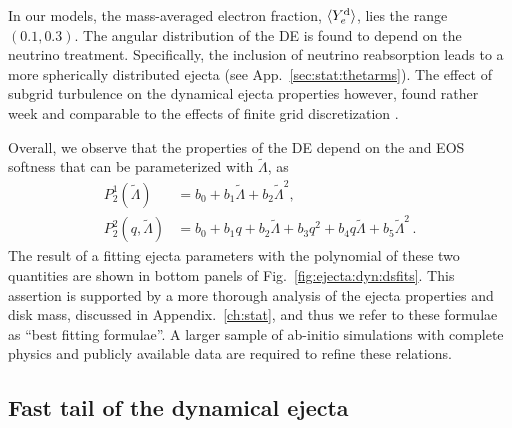 In our models, the mass-averaged electron fraction, $\langle Y^{\text{d}}_{e}\rangle$, 
lies the range $(0.1, 0.3)$.
The angular distribution of the \ac{DE} is found to depend 
on the neutrino treatment. Specifically, the inclusion of 
neutrino reabsorption leads to a more spherically distributed ejecta
(see App.~\ref{sec:stat:thetarms}).
The effect of subgrid turbulence on the dynamical ejecta properties however,
found rather week and comparable to the effects of finite grid discretization 
\citep{Bernuzzi:2020txg,Radice:2020ids}.

Overall, we observe that the properties of the \ac{DE} depend on the \mr{} and 
\ac{EOS} softness that can be parameterized with $\tilde{\Lambda}$, as 
%
\begin{align}\label{eq:polyfit2}
P_2 ^1(\tilde{\Lambda}) &= b_0 + b_1\tilde\Lambda + b_2 \tilde\Lambda^2, \\\label{eq:polyfit22}
P_2 ^2(q,\tilde\Lambda) &= b_0 + b_1q + b_2\tilde\Lambda + b_3q ^2 +  b_4 q \tilde\Lambda + b_5\tilde\Lambda^2 \, .
\end{align}
%
The result of a fitting ejecta parameters with the polynomial of these two quantities 
are shown in bottom panels of Fig.~\ref{fig:ejecta:dyn:dsfits}.
%
This assertion is supported by a more thorough analysis of the ejecta 
properties and disk mass, discussed in Appendix.~\ref{ch:stat}, 
and thus we refer to these formulae as ``best fitting formulae''.
%
A larger sample of ab-initio simulations with complete physics and 
publicly available data are required to refine these relations.




\subsection{Fast tail of the dynamical ejecta} \label{sec:bns_sims:fast_de}

